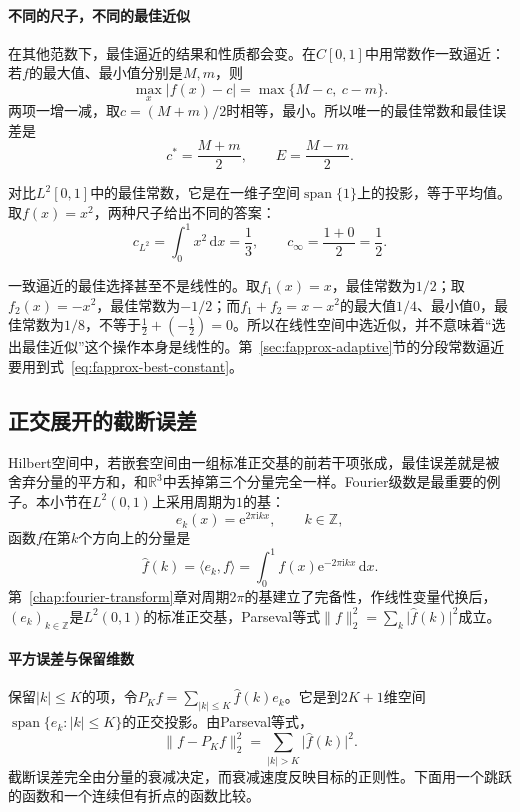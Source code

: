 \paragraph{不同的尺子，不同的最佳近似}
在其他范数下，最佳逼近的结果和性质都会变。在$C[0,1]$中用常数作一致逼近：若$f$的最大值、最小值分别是$M,m$，则
\[
 \max_x\lvert f(x)-c\rvert=\max\{M-c,\ c-m\}.
\]
两项一增一减，取$c=(M+m)/2$时相等，最小。所以唯一的最佳常数和最佳误差是
\begin{equation}
 c^*=\frac{M+m}2,\qquad E=\frac{M-m}2 .
 \label{eq:fapprox-best-constant}
\end{equation}

对比$L^2[0,1]$中的最佳常数，它是在一维子空间$\operatorname{span}\{1\}$上的投影，等于平均值。取$f(x)=x^2$，两种尺子给出不同的答案：
\[
 c_{L^2}=\int_0^1x^2\,\mathrm dx=\frac13,\qquad c_\infty=\frac{1+0}2=\frac12 .
\]

一致逼近的最佳选择甚至不是线性的。取$f_1(x)=x$，最佳常数为$1/2$；取$f_2(x)=-x^2$，最佳常数为$-1/2$；而$f_1+f_2=x-x^2$的最大值$1/4$、最小值$0$，最佳常数为$1/8$，不等于$\frac12+(-\frac12)=0$。所以在线性空间中选近似，并不意味着“选出最佳近似”这个操作本身是线性的。第~\ref{sec:fapprox-adaptive}节的分段常数逼近要用到式~\eqref{eq:fapprox-best-constant}。

\subsection{正交展开的截断误差}
\label{sec:fapprox-fourier-truncation}

Hilbert空间中，若嵌套空间由一组标准正交基的前若干项张成，最佳误差就是被舍弃分量的平方和，和$\mathbb R^3$中丢掉第三个分量完全一样。Fourier级数是最重要的例子。本小节在$L^2(0,1)$上采用周期为$1$的基：
\[
 e_k(x)=\mathrm e^{2\pi\mathrm ikx},\qquad k\in\mathbb Z ,
\]
函数$f$在第$k$个方向上的分量是
\[
 \hat f(k)=\langle e_k,f\rangle=\int_0^1f(x)\mathrm e^{-2\pi\mathrm ikx}\,\mathrm dx .
\]
第~\ref{chap:fourier-transform}章对周期$2\pi$的基建立了完备性，作线性变量代换后，$(e_k)_{k\in\mathbb Z}$是$L^2(0,1)$的标准正交基，Parseval等式$\lVert f\rVert_2^2=\sum_k\lvert\hat f(k)\rvert^2$成立。

\paragraph{平方误差与保留维数}
保留$\lvert k\rvert\leq K$的项，令$P_Kf=\sum_{\lvert k\rvert\leq K}\hat f(k)e_k$。它是到$2K+1$维空间$\operatorname{span}\{e_k:\lvert k\rvert\leq K\}$的正交投影。由Parseval等式，
\begin{equation}
 \lVert f-P_Kf\rVert_2^2=\sum_{\lvert k\rvert>K}\lvert\hat f(k)\rvert^2 .
 \label{eq:fapprox-fourier-tail}
\end{equation}
截断误差完全由分量的衰减决定，而衰减速度反映目标的正则性。下面用一个跳跃的函数和一个连续但有折点的函数比较。

